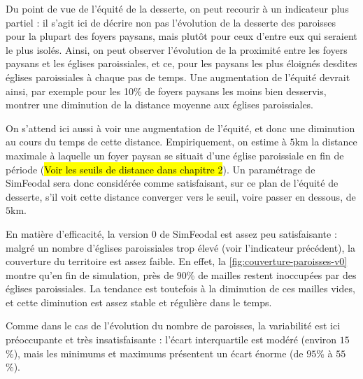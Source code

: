 Du point de vue de l'équité de la desserte, on peut recourir à un indicateur plus partiel : il s'agit ici de décrire non pas l'évolution de la desserte des paroisses pour la plupart des foyers paysans, mais plutôt pour ceux d'entre eux qui seraient le plus isolés.
Ainsi, on peut observer l'évolution de la proximité entre les foyers paysans et les églises paroissiales, et ce, pour les paysans les plus éloignés desdites églises paroissiales à chaque pas de temps.
Une augmentation de l'équité devrait ainsi, par exemple pour les 10\% de foyers paysans les moins bien desservis, montrer une diminution de la distance moyenne aux églises paroissiales.

On s'attend ici aussi à voir une augmentation de l'équité, et donc une diminution au cours du temps de cette distance.
Empiriquement, on estime à $5$km la distance maximale à laquelle un foyer paysan se situait d'une église paroissiale en fin de période (\hl{Voir les seuils de distance dans chapitre 2}).
Un paramétrage de SimFeodal sera donc considérée comme satisfaisant, sur ce plan de l'équité de desserte, s'il voit cette distance converger vers le seuil, voire passer en dessous, de $5$km.



\begin{mdframed}[backgroundcolor=gray!10,footnoteinside=false]

En matière d'efficacité, la version 0 de SimFeodal est assez peu satisfaisante : malgré un nombre d'églises paroissiales trop élevé (voir l'indicateur précédent), la couverture du territoire est assez faible.
En effet, la \cref{fig:couverture-paroisses-v0} montre qu'en fin de simulation, près de $90$\% de mailles restent inoccupées par des églises paroissiales.
La tendance est toutefois à la diminution de ces mailles vides, et cette diminution est assez stable et régulière dans le temps.

Comme dans le cas de l'évolution du nombre de paroisses, la variabilité est ici préoccupante et très insatisfaisante : l'écart interquartile est modéré (environ $15$\%), mais les minimums et maximums présentent un écart énorme (de $95$\% à $55$\%).


\end{mdframed}


